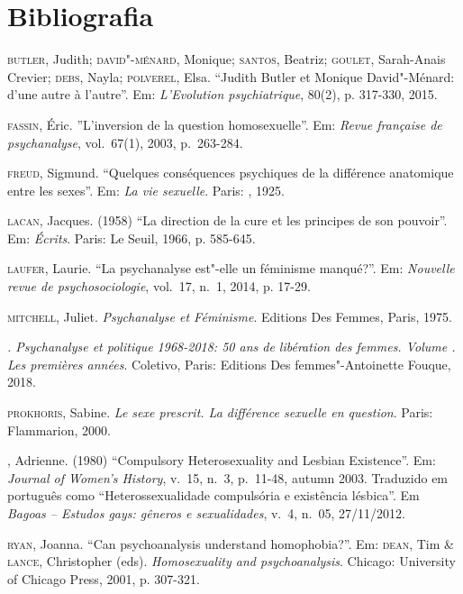 \pagebreak

\section{Bibliografia}

\begin{Parskip}
\textsc{butler}, Judith; \textsc{david"-ménard}, Monique; \textsc{santos}, Beatriz; \textsc{goulet}, Sarah-Anais Crevier; \textsc{debs}, Nayla; \textsc{polverel}, Elsa. ``Judith Butler et Monique David"-Ménard: d'une autre à l'autre''. Em: \emph{L'Evolution psychiatrique}, 80(2), p.
317-330, 2015.

\textsc{fassin}, Éric. ''L'inversion de la question homosexuelle''. Em: \emph{Revue française de psychanalyse}, vol.~67(1), 2003, p.~263-284.

\textsc{freud}, Sigmund. ``Quelques conséquences psychiques de la différence
anatomique entre les sexes''. Em: \emph{La vie sexuelle}. Paris: , 1925.

\textsc{lacan}, Jacques. (1958) ``La direction de la cure et les principes de son pouvoir''. Em:
  \emph{Écrits}. Paris: Le Seuil, 1966, p. 585-645.

\textsc{laufer}, Laurie. ``La psychanalyse est"-elle un féminisme manqué?''. Em:
\emph{Nouvelle revue de psychosociologie}, vol.~17, n.~1, 2014, p. 17-29.
  
\textsc{mitchell}, Juliet. \emph{Psychanalyse et Féminisme}. Editions Des Femmes, Paris, 1975.

\emph{. Psychanalyse et politique 1968-2018: 50 ans de libération des femmes. Volume . Les premières années}. Coletivo, Paris: Editions Des femmes"-Antoinette Fouque, 2018.

\textsc{prokhoris}, Sabine. \emph{Le sexe prescrit. La différence sexuelle en
question}. Paris: Flammarion, 2000.

, Adrienne. (1980) ``Compulsory Heterosexuality and Lesbian Existence''. Em: \emph{Journal of Women's History}, v.~15, n.~3, p.~11-48, autumn 2003. Traduzido em português como ``Heterossexualidade compulsória e existência lésbica''. Em \emph{Bagoas -- Estudos gays: gêneros e sexualidades}, v.~4, n.~05, 27/11/2012.

\textsc{ryan}, Joanna. ``Can psychoanalysis understand homophobia?''. Em: \textsc{dean}, Tim \& \textsc{lance}, Christopher (eds). \emph{Homosexuality and psychoanalysis}. Chicago: University of Chicago Press, 2001, p. 307-321.
\end{Parskip}


